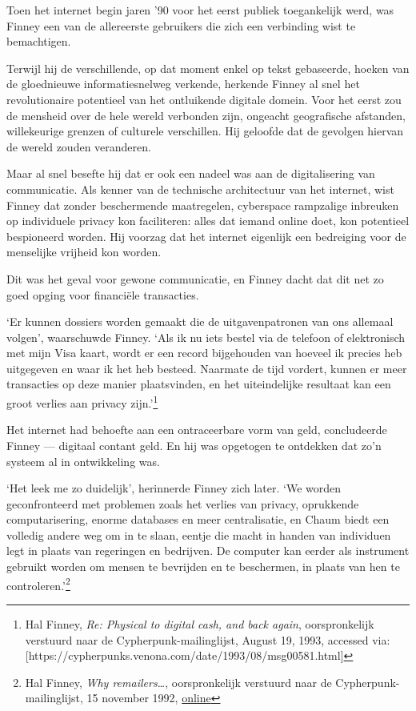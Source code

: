 \documentclass[
  a5paper,
  smalldemyvopaper,11pt,twoside,onecolumn,openright,extrafontsizes,
hidelinks]{memoir}
\begin{document}
Toen het internet begin jaren '90 voor het eerst publiek toegankelijk
werd, was Finney een van de allereerste gebruikers die zich een
verbinding wist te bemachtigen.

Terwijl hij de verschillende, op dat moment enkel op tekst gebaseerde,
hoeken van de gloednieuwe informatiesnelweg verkende, herkende Finney al
snel het revolutionaire potentieel van het ontluikende digitale domein.
Voor het eerst zou de mensheid over de hele wereld verbonden zijn,
ongeacht geografische afstanden, willekeurige grenzen of culturele
verschillen. Hij geloofde dat de gevolgen hiervan de wereld zouden
veranderen.

Maar al snel besefte hij dat er ook een nadeel was aan de digitalisering
van communicatie. Als kenner van de technische architectuur van het
internet, wist Finney dat zonder beschermende maatregelen, cyberspace
rampzalige inbreuken op individuele privacy kon faciliteren: alles dat
iemand online doet, kon potentieel bespioneerd worden. Hij voorzag dat
het internet eigenlijk een bedreiging voor de menselijke vrijheid kon
worden.

Dit was het geval voor gewone communicatie, en Finney dacht dat dit net
zo goed opging voor financiële transacties.

`Er kunnen dossiers worden gemaakt die de uitgavenpatronen van ons
allemaal volgen', waarschuwde Finney. `Als ik nu iets bestel via de
telefoon of elektronisch met mijn Visa kaart, wordt er een record
bijgehouden van hoeveel ik precies heb uitgegeven en waar ik het heb
besteed. Naarmate de tijd vordert, kunnen er meer transacties op deze
manier plaatsvinden, en het uiteindelijke resultaat kan een groot
verlies aan privacy zijn.'\footnote{Hal Finney, \emph{Re: Physical to
  digital cash, and back again}, oorspronkelijk verstuurd naar de
  Cypherpunk-mailinglijst, August 19, 1993, accessed via:
  {[}https://cypherpunks.venona.com/date/1993/08/msg00581.html{]}}

Het internet had behoefte aan een ontraceerbare vorm van geld,
concludeerde Finney --- digitaal contant geld. En hij was opgetogen te
ontdekken dat zo'n systeem al in ontwikkeling was.

`Het leek me zo duidelijk', herinnerde Finney zich later. `We worden
geconfronteerd met problemen zoals het verlies van privacy, oprukkende
computarisering, enorme databases en meer centralisatie, en Chaum biedt
een volledig andere weg om in te slaan, eentje die macht in handen van
individuen legt in plaats van regeringen en bedrijven. De computer kan
eerder als instrument gebruikt worden om mensen te bevrijden en te
beschermen, in plaats van hen te controleren.'\footnote{Hal Finney,
  \emph{Why remailers\ldots{}}, oorspronkelijk verstuurd naar de
  Cypherpunk-mailinglijst, 15 november 1992,
  \href{https://cypherpunks.venona.com/date/1993/08/msg00581.html}{online}}
\end{document}
